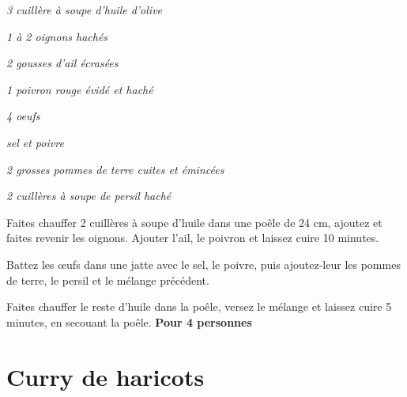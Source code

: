 \documentclass[10pt,a4paper]{report}
\begin{document}
    \begin{multicols}{2}
        \parbox[1cm]{\textwidth}{
            \begin{description}
                \item
                \textit{3 cuillère à soupe d'huile d'olive}
                \item
                \textit{1 à 2 oignons hachés}
                \item
                \textit{2 gousses d'ail écrasées}
                \item
                \textit{1 poivron rouge évidé et haché}
                \item
                \textit{4 oeufs}
                \item
                \textit{sel et poivre}
                \item
                \textit{2 grosses pommes de terre cuites et émincées}
                \item
                \textit{2 cuillères à soupe de persil haché}
            \end{description}
        }
        \columnbreak

        Faites chauffer 2 cuillères à soupe d'huile dans une poêle de 24 cm, ajoutez et faites revenir les oignons. Ajouter l'ail, le poivron et laissez cuire 10 minutes.
        \newline

        Battez les œufs dans une jatte avec le sel, le poivre, puis ajoutez-leur les pommes de terre, le persil et le mélange précédent.
        \newline

        Faites chauffer le reste d'huile dans la poêle, versez le mélange et laissez cuire 5 minutes, en secouant la poêle.
        \newline
        \newline
        \textbf{Pour 4 personnes}
    \end{multicols}

    \newpage

    \section{Curry de haricots}
\end{document}
